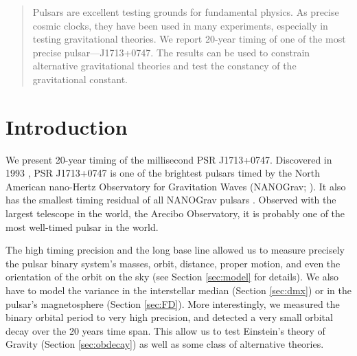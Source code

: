 
\begin{abstract}
Pulsars are excellent testing grounds for fundamental physics. As precise
cosmic clocks, they have been used in many experiments, especially in testing
gravitational theories. We report 20-year timing of one of the most precise
pulsar---J1713+0747. The results can be used to constrain alternative
gravitational theories and test the constancy of the gravitational constant.
\end{abstract}


\section{Introduction}
\label{sec:intro}
\linenumbers
We present 20-year timing of the millisecond  PSR J1713+0747. Discovered in
1993 \citep{fwc93}, PSR J1713+0747 is one of the brightest pulsars timed by the
North American nano-Hertz Observatory for Gravitation Waves (NANOGrav;
\citealt{ndf+12, dfg+13}). It also has the smallest timing residual of all NANOGrav pulsars \citep{dfg+13}. Observed with the largest telescope in the world, the Arecibo Observatory, it is probably one of the most well-timed pulsar in the world.

The high timing precision and the long base line allowed us to measure precisely
the pulsar binary system's  masses, orbit, distance, proper motion, and even
the orientation of the orbit on the sky (see Section \ref{sec:model} for
details). We also have to model the variance in the interstellar median
(Section \ref{sec:dmx}) or in the pulsar's magnetosphere (Section
\ref{sec:FD}). More interestingly, 
we measured the binary orbital period to very high precision, and detected a
very small orbital decay over the 20 years time span. This allow us to test
Einstein's theory of Gravity (Section \ref{sec:obdecay}) as well as some class of alternative theories.


